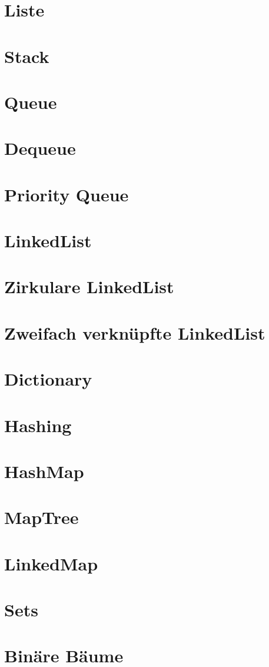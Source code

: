\documentclass{book}
\begin{document}
\section{Liste}
\section{Stack}
\section{Queue}
\section{Dequeue}
\section{Priority Queue}
\section{LinkedList}
\section{Zirkulare LinkedList}
\section{Zweifach verknüpfte LinkedList}
\section{Dictionary}
\section{Hashing}
\section{HashMap}
\section{MapTree}
\section{LinkedMap}
\section{Sets}
\section{Binäre Bäume}
\end{document}
